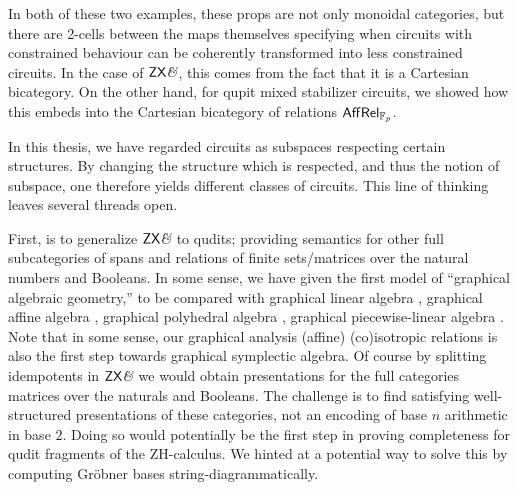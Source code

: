 In both of these two examples, these props are not only monoidal categories, but there are 2-cells between the maps themselves specifying when circuits with constrained behaviour can be coherently transformed into less constrained circuits.  In the case of $\mathsf{ZX}\textit{\&}$, this comes from the fact that it is a Cartesian bicategory. On the other hand, for qupit mixed stabilizer circuits, we showed how this embeds into the Cartesian bicategory of relations $\mathsf{Aff}\mathsf{Rel}_{\mathbb{F}_p}$.



In this thesis, we have regarded  circuits as subspaces respecting certain structures.  By changing the structure which is respected, and thus the notion of subspace, one therefore yields different classes of circuits.  This line of thinking leaves several threads open.

First, is to generalize $\mathsf{ZX}\textit{\&}$ to qudits; providing semantics for other full subcategories of spans and relations of finite sets/matrices over the natural numbers and Booleans. In some sense, we have given the first model of  ``graphical algebraic geometry,'' to be compared with graphical linear algebra \cite{ihpub}, graphical affine algebra \cite{affine}, graphical polyhedral algebra \cite{dpa}, graphical piecewise-linear algebra \cite{dpla}.  Note that in some sense, our graphical analysis (affine) (co)isotropic relations is also the first step towards graphical symplectic algebra.
Of course by splitting idempotents  in $\mathsf{ZX}\textit{\&}$ we would obtain presentations for the full categories  matrices over the naturals and Booleans.  The challenge is to find satisfying well-structured presentations of these categories, not an encoding of base $n$ arithmetic in base $2$.  Doing so would potentially be the first step in proving completeness for qudit fragments of the ZH-calculus.  We hinted at a potential way to solve this by computing Gr\"obner bases string-diagrammatically.  

